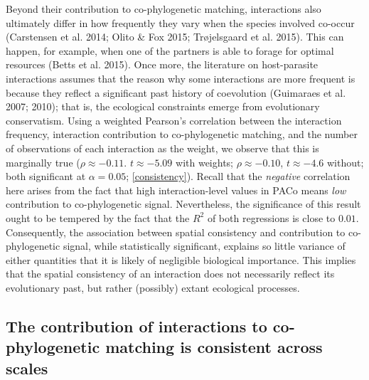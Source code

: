 \documentclass[12pt]{article}
\begin{document}
Beyond their contribution to co-phylogenetic matching, interactions also
ultimately differ in how frequently they vary when the species involved
co-occur (Carstensen et al. 2014; Olito \& Fox 2015; Trøjelsgaard et al.
2015). This can happen, for example, when one of the partners is able to
forage for optimal resources (Betts et al. 2015). Once more, the
literature on host-parasite interactions assumes that the reason why
some interactions are more frequent is because they reflect a
significant past history of coevolution (Guimaraes et al. 2007; 2010);
that is, the ecological constraints emerge from evolutionary
conservatism. Using a weighted Pearson's correlation between the
interaction frequency, interaction contribution to co-phylogenetic
matching, and the number of observations of each interaction as the
weight, we observe that this is marginally true (\(\rho \approx -0.11\).
\(t \approx -5.09\) with weights; \(\rho \approx -0.10\),
\(t \approx -4.6\) without; both significant at \(\alpha = 0.05\);
\autoref{consistency}). Recall that the \emph{negative} correlation here
arises from the fact that high interaction-level values in PACo means
\emph{low} contribution to co-phylogenetic signal. Nevertheless, the
significance of this result ought to be tempered by the fact that the
\(R^2\) of both regressions is close to \(0.01\). Consequently, the
association between spatial consistency and contribution to
co-phylogenetic signal, while statistically significant, explains so
little variance of either quantities that it is likely of negligible
biological importance. This implies that the spatial consistency of an
interaction does not necessarily reflect its evolutionary past, but
rather (possibly) extant ecological processes.

\subsection{The contribution of interactions to co-phylogenetic matching
is consistent across
scales}\label{the-contribution-of-interactions-to-co-phylogenetic-matching-is-consistent-across-scales}
\end{document}
